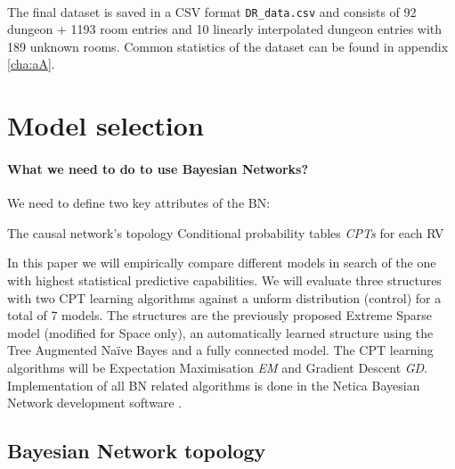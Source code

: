 \documentclass{UoYCSproject}
\begin{document}
\paragraph{}
The final dataset is saved in a CSV format \texttt{DR\_data.csv} and consists of 92 dungeon + 1193 room entries and 10 linearly interpolated dungeon entries with 189 unknown rooms. Common statistics of the dataset can be found in appendix \ref{cha:aA}.

\section{Model selection} %
\label{sec:model_selection}

\paragraph{What we need to do to use Bayesian Networks?}
We need to define two key attributes of the BN:
\begin{outline}[enumerate]
  \1 The causal network's topology
  \1 Conditional probability tables \textit{CPTs} for each RV
\end{outline}
In this paper we will empirically compare different models in search of the one with highest statistical predictive capabilities. We will evaluate three structures with two CPT learning algorithms against a unform distribution (control) for a total of 7 models. The structures are the previously proposed Extreme Sparse model \parencite{SummervilleSamplingHyrule} (modified for Space only), an automatically learned structure using the Tree Augmented Na\"{i}ve Bayes and a fully connected model. The CPT learning algorithms will be Expectation Maximisation \textit{EM} and Gradient Descent \textit{GD}. Implementation of all BN related algorithms is done in the Netica Bayesian Network development software \parencite{netica}.

\subsection{Bayesian Network topology}
\end{document}
